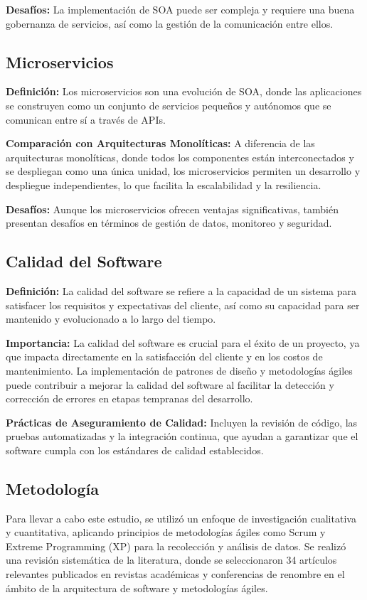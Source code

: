 \documentclass{article}
\begin{document}
\textbf{Desafíos:} La implementación de SOA puede ser compleja y requiere una buena gobernanza de servicios, así como la gestión de la comunicación entre ellos.

\subsection{Microservicios}
\textbf{Definición:} Los microservicios son una evolución de SOA, donde las aplicaciones se construyen como un conjunto de servicios pequeños y autónomos que se comunican entre sí a través de APIs.

\textbf{Comparación con Arquitecturas Monolíticas:} A diferencia de las arquitecturas monolíticas, donde todos los componentes están interconectados y se despliegan como una única unidad, los microservicios permiten un desarrollo y despliegue independientes, lo que facilita la escalabilidad y la resiliencia.

\textbf{Desafíos:} Aunque los microservicios ofrecen ventajas significativas, también presentan desafíos en términos de gestión de datos, monitoreo y seguridad.

\subsection{Calidad del Software}
\textbf{Definición:} La calidad del software se refiere a la capacidad de un sistema para satisfacer los requisitos y expectativas del cliente, así como su capacidad para ser mantenido y evolucionado a lo largo del tiempo.

\textbf{Importancia:} La calidad del software es crucial para el éxito de un proyecto, ya que impacta directamente en la satisfacción del cliente y en los costos de mantenimiento. La implementación de patrones de diseño y metodologías ágiles puede contribuir a mejorar la calidad del software al facilitar la detección y corrección de errores en etapas tempranas del desarrollo.

\textbf{Prácticas de Aseguramiento de Calidad:} Incluyen la revisión de código, las pruebas automatizadas y la integración continua, que ayudan a garantizar que el software cumpla con los estándares de calidad establecidos.

\subsection{Metodología}
Para llevar a cabo este estudio, se utilizó un enfoque de investigación cualitativa y cuantitativa, aplicando principios de metodologías ágiles como Scrum y Extreme Programming (XP) para la recolección y análisis de datos. Se realizó una revisión sistemática de la literatura, donde se seleccionaron 34 artículos relevantes publicados en revistas académicas y conferencias de renombre en el ámbito de la arquitectura de software y metodologías ágiles.
\end{document}
